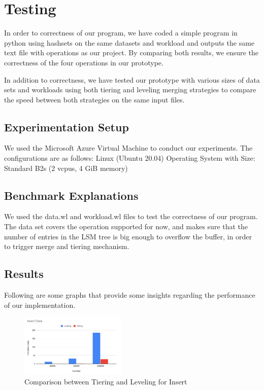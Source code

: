 \documentclass[sigconf]{acmart}
\begin{document}
    \section{Testing}
    In order to correctness of our program, we have coded a simple program in python using hashsets on the same datasets and workload and outputs the same text file with operations as our project. By comparing both results, we ensure the correctness of the four operations in our prototype.

    In addition to correctness, we have tested our prototype with various sizes of data sets and workloads using both tiering and leveling merging strategies to compare the speed between both strategies on the same input files.
    
    \subsection{Experimentation Setup}
    
    We used the Microsoft Azure Virtual Machine to conduct our experiments. The configurations are as follows: Linux (Ubuntu 20.04) Operating System with Size: Standard B2s (2 vcpus, 4 GiB memory)
    
    \subsection{Benchmark Explanations}

    We used the data.wl and workload.wl files to test the correctness of our program. The data set covers the operation supported for now, and makes sure that the number of entries in the LSM tree is big enough to overflow the buffer, in order to trigger merge and tiering mechanism.


    \subsection{Results}
    Following are some graphs that provide some insights regarding the performance of our implementation. 

    \begin{figure}[H]
        \centering
        \includegraphics[width=0.45\textwidth]{LatencyInsert.PNG}
        \caption{Comparison between Tiering and Leveling for Insert}
        \label{Fig.main3}
    \end{figure}
    
\end{document}
